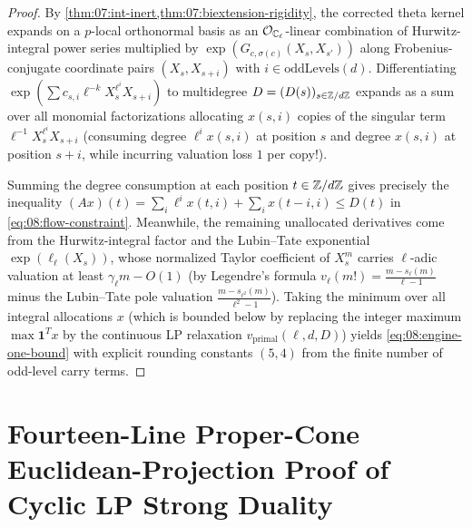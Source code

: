 \begin{proof}
By \cref{thm:07:int-inert,thm:07:biextension-rigidity}, the corrected theta kernel expands on a $p$-local orthonormal basis as an $\mathcal{O}_{\mathbb{C}_\ell}$-linear combination of Hurwitz-integral power series multiplied by $\exp(G_{c, \sigma(c)}(X_s, X_{s'}))$ along Frobenius-conjugate coordinate pairs $(X_s, X_{s + i})$ with $i \in \mathrm{oddLevels}(d)$. Differentiating $\exp(\sum c_{s,i} \ell^{-k} X_s^{\ell^i} X_{s+i})$ to multidegree $D = (D(s))_{s \in \mathbb{Z}/d\mathbb{Z}}$ expands as a sum over all monomial factorizations allocating $x(s, i)$ copies of the singular term $\ell^{-1} X_s^{\ell^i} X_{s+i}$ (consuming degree $\ell^i x(s, i)$ at position $s$ and degree $x(s, i)$ at position $s + i$, while incurring valuation loss $1$ per copy!).

Summing the degree consumption at each position $t \in \mathbb{Z}/d\mathbb{Z}$ gives precisely the inequality $(A x)(t) = \sum_i \ell^i x(t, i) + \sum_i x(t - i, i) \le D(t)$ in \eqref{eq:08:flow-constraint}. Meanwhile, the remaining unallocated derivatives come from the Hurwitz-integral factor and the Lubin--Tate exponential $\exp(\ell_\ell(X_s))$, whose normalized Taylor coefficient of $X_s^m$ carries $\ell$-adic valuation at least $\gamma_\ell m - O(1)$ (by Legendre's formula $v_\ell(m!) = \frac{m - s_\ell(m)}{\ell - 1}$ minus the Lubin--Tate pole valuation $\frac{m - s_{\ell^2}(m)}{\ell^2 - 1}$). Taking the minimum over all integral allocations $x$ (which is bounded below by replacing the integer maximum $\max \mathbf{1}^T x$ by the continuous LP relaxation $v_{\mathrm{primal}}(\ell, d, D)$) yields \eqref{eq:08:engine-one-bound} with explicit rounding constants $(5, 4)$ from the finite number of odd-level carry terms.
\end{proof}

\section{Fourteen-Line Proper-Cone Euclidean-Projection Proof of Cyclic LP Strong Duality}
\label{sec:08:lp-duality}

